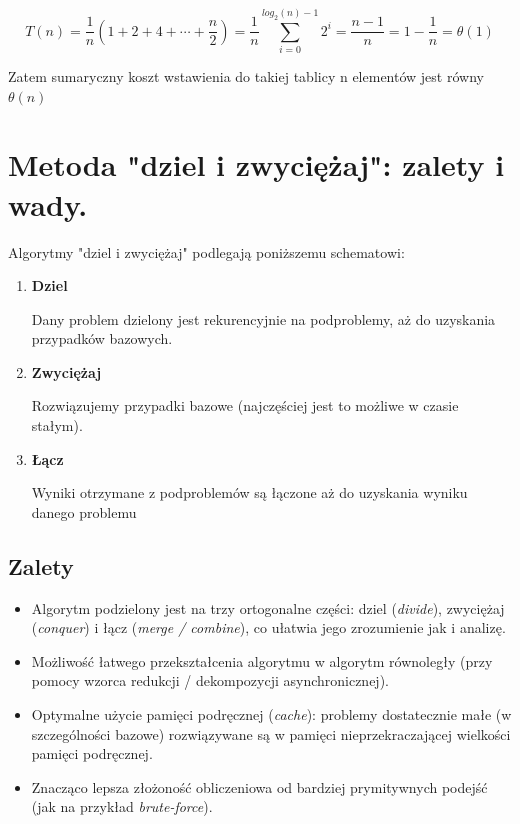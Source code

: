 \documentclass[12pt]{article}
\begin{document}
    $$T(n) = \frac{1}{n} (1 + 2 + 4 + \cdots + \frac{n}{2}) =
    \frac{1}{n} \sum_{i = 0}^{log_2(n) - 1}2^i
    = \frac{n - 1}{n} = 1 - \frac{1}{n} = \theta(1)$$
    
    Zatem sumaryczny koszt wstawienia do takiej tablicy n elementów jest równy $\theta(n)$ 

    \newpage

    \section{Metoda "dziel i zwyciężaj": zalety i wady.}
    
    Algorytmy "dziel i zwyciężaj" podlegają poniższemu schematowi:

    \begin{enumerate}
        \item 
            \textbf{Dziel}

            Dany problem dzielony jest rekurencyjnie na podproblemy, aż do uzyskania przypadków 
            bazowych.

        \item 
            \textbf{Zwyciężaj}

            Rozwiązujemy przypadki bazowe (najczęściej jest to możliwe w 
            czasie stałym).

        \item 
            \textbf{Łącz} 

            Wyniki otrzymane z podproblemów są łączone aż do uzyskania wyniku danego problemu
    \end{enumerate}

    \subsection{Zalety}

    \begin{itemize}
        \item Algorytm podzielony jest na trzy ortogonalne części: dziel (\textit{divide}), 
            zwyciężaj (\textit{conquer}) i łącz (\textit{merge / combine}), co ułatwia jego
            zrozumienie jak i analizę.
        
        \item Możliwość łatwego przekształcenia algorytmu w algorytm równoległy (przy pomocy
            wzorca redukcji / dekompozycji asynchronicznej).

        \item Optymalne użycie pamięci podręcznej (\textit{cache}): problemy dostatecznie małe
            (w szczególności bazowe) rozwiązywane są w pamięci
            nieprzekraczającej wielkości pamięci podręcznej.
        
        \item Znacząco lepsza złożoność obliczeniowa od bardziej prymitywnych
            podejść (jak na przykład \textit{brute-force}).
    \end{itemize}
\end{document}
